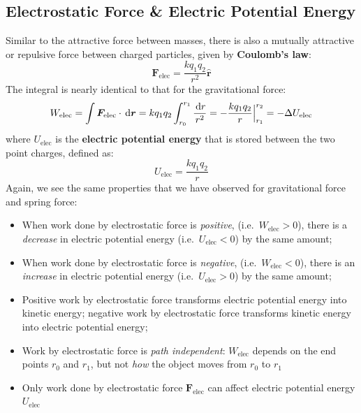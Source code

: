 \subsection{Electrostatic Force \& Electric Potential Energy}
Similar to the attractive force between masses, there is also a mutually
attractive or repulsive force between charged particles, given by
\textbf{Coulomb's law}:
\begin{equation}
  \bm F_\text{elec}=\frac{kq_1q_2}{r^2}\hat{\bm r}
\end{equation}
The integral is nearly identical to that for the gravitational force:
\begin{equation}
  W_\text{elec}=\int\bm F_\text{elec}\cdot\dl{\bm r}
  =kq_1q_2\int_{r_0}^{r_1}\frac{\dl r}{r^2}
    =-\frac{kq_1q_2} r\Big|^{r_2}_{r_1}=-\Delta U_\text{elec}
\end{equation}
where $U_\text{elec}$ is the \textbf{electric potential energy} that is stored
between the two point charges, defined as:
\begin{equation}
  U_\text{elec} = \frac{kq_1q_2}r
\end{equation}
Again, we see the same properties that we have observed for gravitational force
and spring force:
\begin{definition}
  \begin{itemize}[itemsep=6pt]
  \item When work done by electrostatic force is \emph{positive}, (i.e.\
    $W_\text{elec}>0$), there is a \emph{decrease} in electric potential energy
    (i.e.\ $U_\text{elec}<0$) by the same amount;
  \item When work done by electrostatic force is \emph{negative}, (i.e.\
    $W_\text{elec}<0$), there is an \emph{increase} in electric potential energy
    (i.e.\ $U_\text{elec}>0$) by the same amount;
  \item Positive work by electrostatic force transforms electric potential
    energy into kinetic energy; negative work by electrostatic force transforms
    kinetic energy into electric potential energy;
  \item Work by electrostatic force is \emph{path independent}:
    $W_\text{elec}$ depends on the end points $r_0$ and $r_1$, but not
    \emph{how} the object moves from $r_0$ to $r_1$
  \item Only work done by electrostatic force $\bm F_\text{elec}$ can affect
    electric potential energy $U_\text{elec}$
  \end{itemize}
\end{definition}



